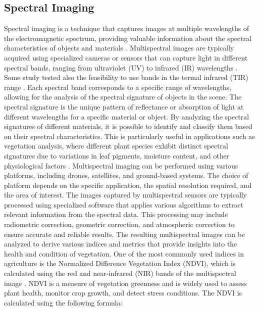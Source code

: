 \documentclass[12pt,a4paper,oneside]{report}
\begin{document}
\subsection{Spectral Imaging}
Spectral imaging is a technique that captures images at multiple wavelengths
of the electromagnetic spectrum, providing valuable information about the spectral
characteristics of objects and materials
\cite{van_der_meer_imaging_2001, thenkabail_hyperspectral_2016}. 
Multispectral images are typically acquired using specialized
cameras or sensors that can capture light in different spectral bands, ranging
from ultraviolet (UV) to infrared (IR) wavelengths
\cite{thenkabail_spectral_2013, Mahlein}. 
Some study tested also the 
feasibility to use bands in the termal infrared (TIR) range \cite{wanOptimizingUAVbasedUncooled2024}.
Each spectral band corresponds
to a specific range of wavelengths, allowing for the analysis of the spectral
signature of objects in the scene.
The spectral signature is the unique pattern of reflectance or absorption of
light at different wavelengths for a specific material or object. By analyzing
the spectral signatures of different materials, it is possible to identify and
classify them based on their spectral characteristics. This is particularly useful
in applications such as vegetation analysis, where different plant species exhibit
distinct spectral signatures due to variations in leaf pigments, moisture content,
and other physiological factors
\cite{sarvia}.
Multispectral imaging can be performed using various platforms, including
drones, satellites, and ground-based systems. The choice of platform depends on
the specific application, the spatial resolution required, and the area of interest.
The images captured by multispectral sensors are typically processed using
specialized software that applies various algorithms to extract relevant information
from the spectral data. This processing may include radiometric correction,
geometric correction, and atmospheric correction to ensure accurate and reliable
results.
The resulting multispectral images can be analyzed to derive various indices
and metrics that provide insights into the health and condition of vegetation.
One of the most commonly used indices in agriculture is the Normalized Difference
Vegetation Index (NDVI), which is calculated using the red and near-infrared
(NIR) bands of the multispectral image \cite{rouse_monitoring_1974, tucker_red_1979}. 
NDVI is a measure of vegetation
greenness and is widely used to assess plant health, monitor crop growth, and
detect stress conditions. The NDVI is calculated using the following formula:
\end{document}
